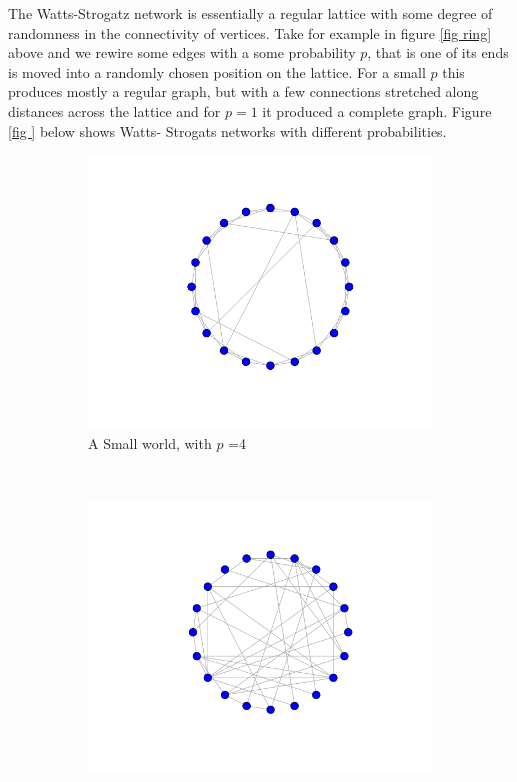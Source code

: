 The Watts-Strogatz network is essentially a regular lattice with some degree of randomness in the connectivity of vertices. Take for example in figure \ref{fig ring} above and we rewire some edges with a some probability $p$, that is one of its ends is moved into a randomly chosen position on the lattice. For a small $p$ this produces mostly a regular graph, but with a few connections stretched along distances across the lattice and for $p =1$ it produced a complete graph. Figure \ref{fig } below shows Watts- Strogats networks with different probabilities.

\begin{figure}[h!]
    \centering
    \begin{subfigure}[b]{0.4\textwidth}
        \includegraphics[scale=0.4]{images/sw_p1.png} 
        \caption{A Small world, with $p$ =4}
        \label{fig:gull}
    \end{subfigure}
    ~ %
    \begin{subfigure}[b]{0.4\textwidth}
        \includegraphics[scale=0.4]{images/sw_p5.png} 

\end{subfigure}
\end{figure}
